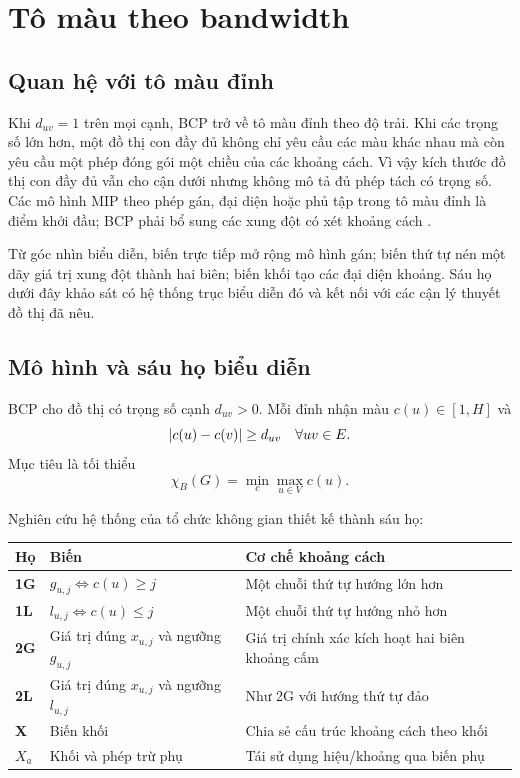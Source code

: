 \section{Tô màu theo bandwidth}

\subsection{Quan hệ với tô màu đỉnh}

Khi \(d_{uv}=1\) trên mọi cạnh, BCP trở về tô màu đỉnh theo độ trải. Khi các
trọng số lớn hơn, một đồ thị con đầy đủ không chỉ yêu cầu các màu khác nhau mà
còn yêu cầu một phép đóng gói một chiều của các khoảng cách. Vì vậy kích thước
đồ thị con đầy đủ
vẫn cho cận dưới nhưng không mô tả đủ phép tách có trọng số. Các mô hình MIP
theo phép gán, đại diện hoặc phủ tập trong tô màu đỉnh là điểm khởi đầu; BCP
phải bổ sung các xung đột có xét khoảng cách
\parencite{malaguti2010coloring}.

Từ góc nhìn biểu diễn, biến trực tiếp mở rộng mô hình gán; biến thứ tự nén một dãy
giá trị xung đột thành hai biên; biến khối tạo các đại diện khoảng. Sáu họ dưới
đây khảo sát có hệ thống trục biểu diễn đó và kết nối với các cận lý thuyết đồ
thị đã nêu.

\subsection{Mô hình và sáu họ biểu diễn}

BCP cho đồ thị có trọng số cạnh \(d_{uv}>0\). Mỗi đỉnh nhận màu
\(c(u)\in[1,H]\) và
\[
  \lvert c(u)-c(v)\rvert\ge d_{uv}
  \quad\forall uv\in E.
\]
Mục tiêu là tối thiểu
\[
  \chi_B(G)=\min_c\max_{u\in V}c(u).
\]

Nghiên cứu hệ thống của \textcite{nguyen2026bcp} tổ chức không gian thiết kế thành sáu
họ:
\begin{center}
\label{tab:bcp-encodings}
\begin{tabularx}{\textwidth}{@{}>{\bfseries\sffamily}p{}p{}Y@{}}
\toprule
Họ & Biến & Cơ chế khoảng cách\\
\midrule
1G & \(g_{u,j}\iff c(u)\ge j\) & Một chuỗi thứ tự hướng lớn hơn\\
1L & \(l_{u,j}\iff c(u)\le j\) & Một chuỗi thứ tự hướng nhỏ hơn\\
2G & Giá trị đúng \(x_{u,j}\) và ngưỡng \(g_{u,j}\) &
Giá trị chính xác kích hoạt hai biên khoảng cấm\\
2L & Giá trị đúng \(x_{u,j}\) và ngưỡng \(l_{u,j}\) &
Như 2G với hướng thứ tự đảo\\
X & Biến khối & Chia sẻ cấu trúc khoảng cách theo khối\\
\(X_a\) & Khối và phép trừ phụ &
Tái sử dụng hiệu/khoảng qua biến phụ\\
\bottomrule
\end{tabularx}
\end{center}

